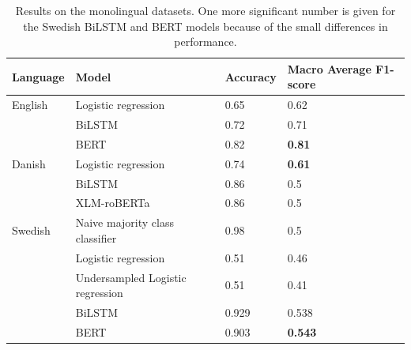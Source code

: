 \documentclass[nofilelist]{cslthse-msc}
\begin{document}
\begin{table}[t]
\centering
\begin{tabular}{@{}llll@{}}
\toprule
Language & Model    & Accuracy & Macro Average F1-score  \\ \midrule
English & Logistic regression & 0.65 & 0.62     \\
& BiLSTM      & 0.72 & 0.71     \\
& BERT       & 0.82 & \textbf{0.81}     \\
Danish & Logistic regression & 0.74 & \textbf{0.61}     \\
& BiLSTM      & 0.86 & 0.5     \\
& XLM-roBERTa       & 0.86 & 0.5 \\
Swedish & Naive majority class classifier & 0.98 & 0.5 \\
& Logistic regression & 0.51 & 0.46     \\
& Undersampled Logistic regression & 0.51 & 0.41     \\
& BiLSTM & 0.929 & 0.538     \\
& BERT       & 0.903 & \textbf{0.543}\\
\bottomrule
\end{tabular}
\caption{Results on the monolingual datasets. One more significant number is given for the Swedish BiLSTM and BERT models because of the small differences in performance.}
\label{tab:monolingual}
\end{table}
\end{document}
